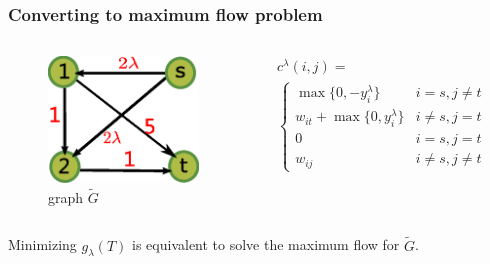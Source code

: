 \documentclass[notheorems]{beamer}
\begin{document}
\begin{frame}
	\frametitle{Converting to maximum flow problem}
\begin{columns}
	\column{4cm}
	\begin{figure}
		\includegraphics[width=4cm]{pic/example_st.eps}
		\caption{graph $\widetilde{G}$}
	\end{figure}
	\column{6cm}
	\begin{align*}
		& c^{\lambda}(i, j)  = \\ 
		& \begin{cases}
			\max\{0, -y^{\lambda}_i\} &  i = s, j \neq t \\
			w_{it} + \max\{0, y^{\lambda}_i\} & i\neq s, j = t\\
			0 & i = s, j = t\\
			w_{ij} & i \neq s, j \neq t
		\end{cases}
	\end{align*}
\end{columns}	
Minimizing $g_{\lambda}(T)$ is equivalent to solve the maximum flow for $\widetilde{G}$.
\end{frame}	
\end{document}
